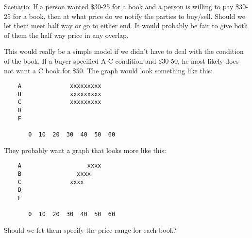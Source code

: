 Scenario:  If a person wanted \$30-25 for a book and a person is willing to pay
\$30-25 for a book, then at what price do we notify the parties to buy/sell.
Should we let them meet half way or go to either end.  It would probably be
fair to give both of them the half way price in any overlap.

This would really be a simple model if we didn't have to deal with the
condition of the book.  If a buyer specified A-C condition and \$30-50, he
most likely does not want a C book for \$50.  The graph would look something
like this:

\begin{verbatim}
	A              xxxxxxxxx
	B      	       xxxxxxxxx
	C              xxxxxxxxx
	D
	F

	   0  10  20  30  40  50  60
\end{verbatim}

They probably want a graph that looks more like this:

\begin{verbatim}
	A                   xxxx
	B      	         xxxx
	C              xxxx
	D
	F

	   0  10  20  30  40  50  60
\end{verbatim}

Should we let them specify the price range for each book?


